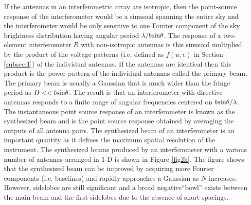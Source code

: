 If the antennas in an interferometric array are isotropic, then the  point-source response of the interferometer would be a sinusoid spanning the entire sky and the interferometer would be only sensitive to one Fourier component of the sky brightness distribution having angular period $\lambda/b\rm{sin}\theta$. The response of a two-element interferometer $R$ with non-isotropic antennas is this sinusoid multiplied by the product of the voltage patterns (i.e. defined as $f(u,v)$ in Section \ref{subsec:1}) of the individual antennas. If the antennas are identical then this product is the power pattern of the individual antennas called the primary beam. The primary beam is usually a Gaussian that is much wider than the fringe period as $D << b\rm{sin}\theta$. The result is that an interferometer with directive antennas responds to a finite range of angular frequencies centered on $b\rm{sin}\theta /\lambda$. The instantaneous point source response of an interferometer is known as the synthesized beam and is the point source response obtained by averaging the outputs of all antenna pairs. The synthesized beam of an interferometer is an important quantity as it defines the maximum spatial resolution of the instrument. The synthesized beams produced by an interferometer with a various number of antennas arranged in 1-D is shown in Figure \ref{fig2h}. The figure shows that the synthesized beam can be improved by acquiring more Fourier components (i.e. baselines) and rapidly approaches a Gaussian as $N$ increases. However, sidelobes are still significant and a broad negative``bowl'' exists between the main beam and the first sidelobes due to the absence of short spacings.

